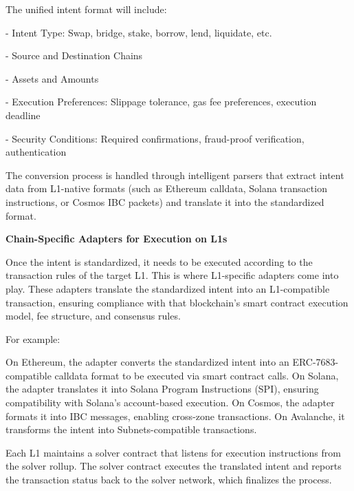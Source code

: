 The unified intent format will include:

-   Intent Type: Swap, bridge, stake, borrow, lend, liquidate, etc.

-   Source and Destination Chains
    
-   Assets and Amounts
    
-   Execution Preferences: Slippage tolerance, gas fee preferences, execution deadline
    
-   Security Conditions: Required confirmations, fraud-proof verification, authentication

The conversion process is handled through intelligent parsers that extract intent data from L1-native formats (such as Ethereum calldata, Solana transaction instructions, or Cosmos IBC packets) and translate it into the standardized format.

\noindent
\textbf{Chain-Specific Adapters for Execution on L1s}

Once the intent is standardized, it needs to be executed according to the transaction rules of the target L1. This is where L1-specific adapters come into play. These adapters translate the standardized intent into an L1-compatible transaction, ensuring compliance with that blockchain's smart contract execution model, fee structure, and consensus rules.

For example:

    On Ethereum, the adapter converts the standardized intent into an ERC-7683-compatible calldata format to be executed via smart contract calls.
    On Solana, the adapter translates it into Solana Program Instructions (SPI), ensuring compatibility with Solana’s account-based execution.
    On Cosmos, the adapter formats it into IBC messages, enabling cross-zone transactions.
    On Avalanche, it transforms the intent into Subnets-compatible transactions.

Each L1 maintains a solver contract that listens for execution instructions from the solver rollup. The solver contract executes the translated intent and reports the transaction status back to the solver network, which finalizes the process.

